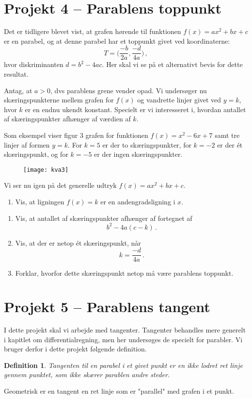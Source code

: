 \documentclass[12pt,oneside,a4paper]{article}
\theoremstyle{plain}
\newtheorem*{mydef}{Definition}
\begin{document}
\section*{Projekt 4 -- Parablens toppunkt}
Det er tidligere blevet vist, at grafen hørende til funktionen $f(x) = ax^2 + bx + c$
er en parabel, og at denne parabel har et toppunkt givet ved koordinaterne:
\[
    T = \Big(\frac{-b}{2a}, \frac{-d}{4a}\Big) \,,
\]
hvor diskriminanten $d=b^2-4ac$. Her skal vi se på et alternativt bevis for dette
resultat.

Antag, at $a>0$, dvs parablens grene vender opad. Vi undersøger nu
skæringspunkterne mellem grafen for $f(x)$ og vandrette linjer givet ved $y=k$,
hvor $k$ er en endnu ukendt konstant.  Specielt er vi interesseret i, hvordan
antallet af skæringspunkter afhænger af værdien af $k$.

Som eksempel viser figur 3 grafen for funktionen $f(x) = x^2-6x+7$ samt tre linjer 
af formen $y=k$. For $k=5$ er der to skæringspunkter, for $k=-2$ er der ét skæringspunkt,
og for $k=-5$ er der ingen skæringspunkter.

\begin{figure}[ht]
    \centering
    \texttt{[image: kva3]}
    \caption{}
    \label{fig3}
\end{figure}

Vi ser nu igen på det generelle udtryk $f(x) = ax^2 + bx + c$.
\begin{enumerate}[label=(\alph*)]
    \item Vis, at ligningen $f(x) = k$ er en andengradsligning i $x$.
\end{enumerate}

\begin{enumerate}[label=(\alph*), resume]
    \item Vis, at antallet af skæringspunkter afhænger af fortegnet af 
        \[
            b^2-4a(c-k) \,.
        \]
    \item Vis, at der er netop ét skæringspunkt, når
        \[
            k = \frac{-d}{4a} \,.
        \]
    \item Forklar, hvorfor dette skæringspunkt netop må være parablens toppunkt.
\end{enumerate}

\section*{Projekt 5 -- Parablens tangent}
I dette projekt skal vi arbejde med tangenter. Tangenter behandles mere generelt
i kapitlet om differentialregning, men her undersøges de specielt for parabler.
Vi bruger derfor i dette projekt følgende definition.
\begin{mydef}
    Tangenten til en parabel i et givet punkt er en ikke lodret ret linje
    gennem punktet, som ikke skærer parablen andre steder.
\end{mydef}
Geometrisk er en tangent en ret linje som er "parallel" med grafen i et punkt.
\end{document}

